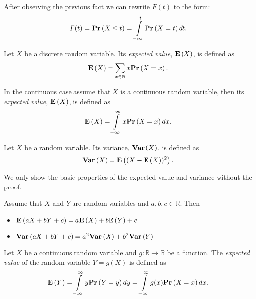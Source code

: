 After observing the previous fact we can rewrite $F(t)$ to the form:
\[
F(t) = \mathbf{Pr}\left(X \leq t\right) = \int\limits_{-\infty}^{t} \mathbf{Pr}\left(X = t\right) dt \text{.}
\]

\begin{definition}
Let $X$ be a discrete random variable. Its \emph{expected value}, $\mathbf{E}\left(X\right)$, is defined as
\[
\mathbf{E}\left(X\right) = \displaystyle\sum_{x \in \mathbb{N}} x \mathbf{Pr}\left(X = x\right) \text{.}
\]

In the continuous case assume that $X$ is a continuous random variable, then its \emph{expected value}, $\mathbf{E}\left(X\right)$, is defined as
\[
\mathbf{E}\left(X\right) = \int\limits_{-\infty}^{\infty} x \mathbf{Pr}\left(X = x\right) dx \text{.}
\]
\end{definition}

\begin{definition}[Variance]
Let $X$ be a random variable. Its variance, $\mathbf{Var}\left(X\right)$, is defined as \[ \mathbf{Var}\left(X\right) = \mathbf{E}\left((X - \mathbf{E}\left(X\right)) ^ 2\right) \text{.} \]
\end{definition}

We only show the basic properties of the expected value and variance without the proof. 
\begin{lemma}
Assume that $X$ and $Y$ are random variables and $a, b, c \in \mathbb{R}$. Then
\label{lemma-expected-value-properties}
\begin{itemize}
\item $\mathbf{E}\left(aX + bY + c\right) = a\mathbf{E}\left(X\right) + b\mathbf{E}\left(Y\right) + c$
\item $\mathbf{Var}\left(aX + bY + c\right) = a ^ 2 \mathbf{Var}\left(X\right) + b ^ 2 \mathbf{Var}\left(Y\right)$
\end{itemize}
\end{lemma}

\begin{definition}
Let $X$ be a continuous random variable and $g: \mathbb{R} \rightarrow \mathbb{R}$ be a function. The \emph{expected value} of the random variable $Y = g(X)$ is defined as
\[
\mathbf{E}\left(Y\right) = \int\limits_{-\infty}^{\infty} y\mathbf{Pr}\left(Y = y\right) dy = \int\limits_{-\infty}^{\infty} g(x)\mathbf{Pr}\left(X = x\right) dx \text{.}
\]
\end{definition}

